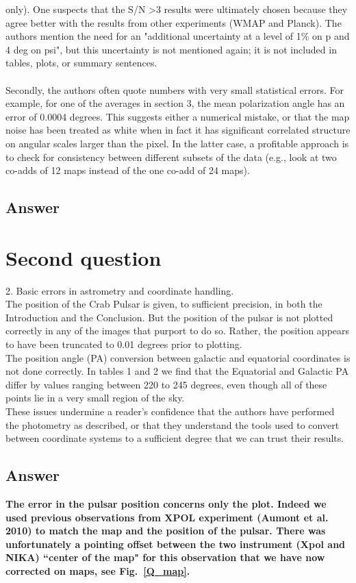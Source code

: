 \documentclass[report,twocolumn]{aa}
\begin{document}
only). One suspects that the S/N \textgreater 3 results were ultimately chosen
because they agree better with the results from other experiments
(WMAP and Planck). The authors mention the need for an "additional
uncertainty at a level of 1\% on p and 4 deg on psi", but this
uncertainty is not mentioned again; it is not included in tables,
plots, or summary sentences.
\\ \\
Secondly, the authors often quote numbers with very small statistical
errors. For example, for one of the averages in section 3, the mean
polarization angle has an error of 0.0004 degrees. This suggests
either a numerical mistake, or that the map noise has been
treated as white when in fact it has significant correlated structure
on angular scales larger than the pixel. In the latter case, a
profitable approach is to check for consistency between different
subsets of the data (e.g., look at two co-adds of 12 maps instead of
the one co-add of 24 maps).

\subsection{\textbf{Answer}}

\section{Second question}
2. Basic errors in astrometry and coordinate handling.
\\
The position of the Crab Pulsar is given, to sufficient precision, in
both the Introduction and the Conclusion. But the position of the
pulsar is not plotted correctly in any of the images that purport to
do so. Rather, the position appears to have been truncated to 0.01
degrees prior to plotting.
\\
The position angle (PA) conversion between galactic and equatorial
coordinates is not done correctly. In tables 1 and 2 we find that the
Equatorial and Galactic PA differ by values ranging between 220 to 245
degrees, even though all of these points lie in a very small region of
the sky.
\\
These issues undermine a reader's confidence that the authors have
performed the photometry as described, or that they understand the
tools used to convert between coordinate systems to a sufficient
degree that we can trust their results.
\subsection{\textbf{Answer}}
\textbf{The error in the pulsar position concerns only the plot.
Indeed we used previous observations from XPOL experiment (Aumont et al. 2010) to match the map and the position of the pulsar.
There was unfortunately a pointing offset between the two instrument (Xpol and NIKA) ``center of the map" for this observation that we have now corrected on maps, see Fig.~\ref{Q_map}.}
\end{document}
